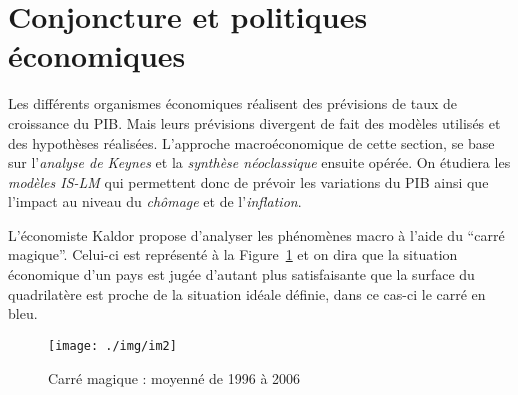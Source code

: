\section{Conjoncture et politiques économiques} %
\label{prt:conjoncture_et_politiques_economiques}

Les différents organismes économiques réalisent des prévisions de taux de croissance du PIB. Mais leurs prévisions divergent de fait des modèles utilisés et 
des hypothèses réalisées.
L'approche macroéconomique de cette section, se base sur l'\emph{analyse de Keynes} 
et la \emph{synthèse néoclassique} ensuite opérée. 
On étudiera les \emph{modèles IS-LM} qui permettent donc de prévoir
les variations du PIB ainsi que l'impact au niveau du \emph{chômage} et de l'\emph{inflation}. 

L'économiste Kaldor propose d'analyser les phénomènes macro à l'aide du ``carré magique''.
Celui-ci est représenté à la Figure~\ref{fig:carre_magique} et on dira que la situation
économique d'un pays est jugée d'autant plus satisfaisante que la surface du quadrilatère
est proche de la situation idéale définie, dans ce cas-ci le carré en bleu.

\begin{figure}[h]
	\begin{center}
		\texttt{[image: ./img/im2]}
	\end{center}
	\caption{Carré magique : moyenné de 1996 à 2006}
  \label{fig:carre_magique}
\end{figure}

